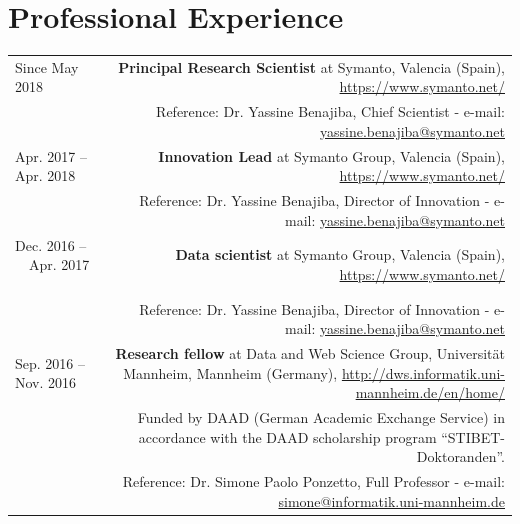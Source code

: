 \documentclass[10pt]{article}
\begin{document}
\section*{Professional Experience}
\begin{tabular}{L!{\VRule}R}

Since May~ 2018 &{\textbf{Principal Research Scientist} at Symanto, Valencia (Spain), \url{https://www.symanto.net/}}\\
&\scriptsize{Reference: Dr. Yassine Benajiba, Chief Scientist - e-mail: \href{mailto:yassine.benajiba@symanto.net}{yassine.benajiba@symanto.net}}\\

Apr. 2017 -- Apr. 2018~~~ &{\textbf{Innovation Lead} at Symanto Group, Valencia (Spain), \url{https://www.symanto.net/}}\\
&\scriptsize{Reference: Dr. Yassine Benajiba, Director of Innovation - e-mail: \href{mailto:yassine.benajiba@symanto.net}{yassine.benajiba@symanto.net}}\\

Dec. 2016 -- ~~Apr. 2017 ~~&{\textbf{Data scientist} at Symanto Group, Valencia (Spain), \url{https://www.symanto.net/}}\\
&\scriptsize{Reference: Dr. Yassine Benajiba, Director of Innovation - e-mail: \href{mailto:yassine.benajiba@symanto.net}{yassine.benajiba@symanto.net}}\\


 Sep. 2016 -- Nov. 2016 ~~&{\textbf{Research fellow} at Data and Web Science Group, Universit{\"a}t Mannheim, Mannheim (Germany), \url{http://dws.informatik.uni-mannheim.de/en/home/}}\\
 &\scriptsize{Funded by DAAD (German Academic Exchange Service) in accordance with the DAAD scholarship program ``STIBET-Doktoranden''.}\\
 &\scriptsize{Reference: Dr. Simone Paolo Ponzetto, Full Professor - e-mail: \href{mailto:simone@informatik.uni-mannheim.de}{simone@informatik.uni-mannheim.de}}\\


\end{tabular}
\end{document}
